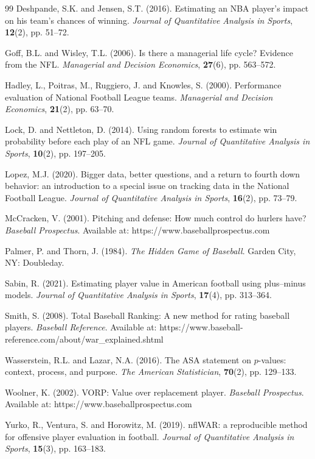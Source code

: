\documentclass[USenglish]{article}
\theoremstyle{dgthm}
\theoremstyle{dgdef}
\begin{document}
\begin{thebibliography}{99}
Deshpande, S.K. and Jensen, S.T. (2016). Estimating an NBA player's impact on his team's chances of winning. \emph{Journal of Quantitative Analysis in Sports}, \textbf{12}(2), pp. 51--72.

Goff, B.L. and Wisley, T.L. (2006). Is there a managerial life cycle? Evidence from the NFL. \emph{Managerial and Decision Economics}, \textbf{27}(6), pp. 563--572.

Hadley, L., Poitras, M., Ruggiero, J. and Knowles, S. (2000). Performance evaluation of National Football League teams. \emph{Managerial and Decision Economics}, \textbf{21}(2), pp. 63--70.

Lock, D. and Nettleton, D. (2014). Using random forests to estimate win probability before each play of an NFL game. \emph{Journal of Quantitative Analysis in Sports}, \textbf{10}(2), pp. 197--205.

Lopez, M.J. (2020). Bigger data, better questions, and a return to fourth down behavior: an introduction to a special issue on tracking data in the National Football League. \emph{Journal of Quantitative Analysis in Sports}, \textbf{16}(2), pp. 73--79.

McCracken, V. (2001). Pitching and defense: How much control do hurlers have? \emph{Baseball Prospectus}. Available at: https://www.baseballprospectus.com

Palmer, P. and Thorn, J. (1984). \emph{The Hidden Game of Baseball}. Garden City, NY: Doubleday.

Sabin, R. (2021). Estimating player value in American football using plus--minus models. \emph{Journal of Quantitative Analysis in Sports}, \textbf{17}(4), pp. 313--364.

Smith, S. (2008). Total Baseball Ranking: A new method for rating baseball players. \emph{Baseball Reference}. Available at: https://www.baseball-reference.com/about/war\_explained.shtml

Wasserstein, R.L. and Lazar, N.A. (2016). The ASA statement on $p$-values: context, process, and purpose. \emph{The American Statistician}, \textbf{70}(2), pp. 129--133.

Woolner, K. (2002). VORP: Value over replacement player. \emph{Baseball Prospectus}. Available at: https://www.baseballprospectus.com

Yurko, R., Ventura, S. and Horowitz, M. (2019). nflWAR: a reproducible method for offensive player evaluation in football. \emph{Journal of Quantitative Analysis in Sports}, \textbf{15}(3), pp. 163--183.

\end{thebibliography}
\end{document}
